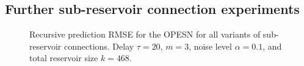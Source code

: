 \pagebreak

\subsection{Further sub-reservoir connection experiments}

\begin{figure}[h]
    \centering
    \caption{Recursive prediction RMSE for the OPESN for all variants of sub-reservoir connections. Delay $\tau=20$, $m=3$, noise level $\alpha=0.1$, and total reservoir size $k=468$.}
    \label{fig:OPESN_recursive_sub_reservoir_connections_m_2}
\end{figure}

